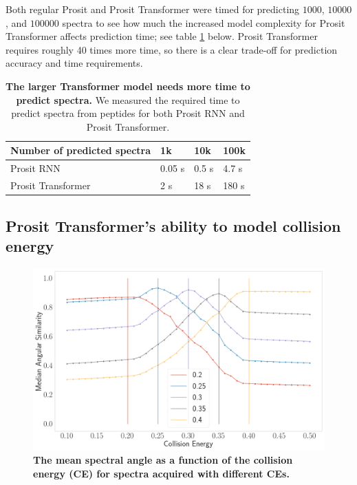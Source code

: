 \documentclass[10pt,a4paper]{article}
\begin{document}
Both regular Prosit and Prosit Transformer were timed for predicting $1000$, $10000$, and $100000$ spectra to see how much the increased model complexity for Prosit Transformer affects prediction time; see table \ref{tab:predictionTime} below. Prosit Transformer requires roughly 40 times more time, so there is a clear trade-off for prediction accuracy and time requirements. 

\begin{table}[htbp]
    \caption{{\bf The larger Transformer model needs more time to predict spectra.} We measured the required time to predict spectra from peptides for both Prosit RNN and Prosit Transformer.}
      \begin{tabular}{l|lll}
      \hline
      Number of predicted spectra & 1k & 10k  & 100k \\
      \hline
      Prosit RNN & 0.05 s & 0.5 s  & 4.7 s \\
      Prosit Transformer & 2 s    & 18 s   & 180 s \\
      \hline
      \end{tabular}%
    \label{tab:predictionTime}%
  \end{table}%
  

\subsection*{Prosit Transformer’s ability to model collision energy}

\begin{figure}[ht!]
    \centering
    \includegraphics[width=12cm]{./img/ce_calibration.png}
    \caption{{\bf The mean spectral angle as a function of the collision energy (CE) for spectra acquired with different CEs.}\label{fig:ce}}
\end{figure}
    
\end{document}
